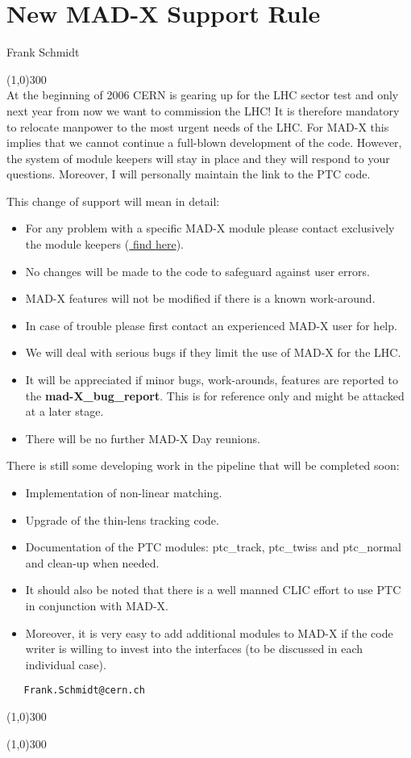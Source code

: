 
\section{New MAD-X Support Rule}

Frank Schmidt 

\line(1,0){300}
\\
 At the beginning of 2006 CERN is gearing up for the LHC sector test and
 only next year from now we want to commission the LHC! It is therefore
 mandatory to relocate manpower to the most urgent needs of the LHC. For
 MAD-X this implies that we cannot continue a full-blown development of
 the code. However, the system of module keepers will stay in place and
 they will respond to your questions. Moreover, I will personally
 maintain the link to the PTC code.  

 This change of support will mean in detail:  
\begin{itemize}
   \item For any problem with a specific MAD-X module please contact
     exclusively the module keepers (\href{module/node1.html}{ find
       here}). 
   \item No changes will be made to the code to safeguard against user errors.
   \item MAD-X features will not be modified if there is a known work-around.
   \item In case of trouble please first contact an experienced MAD-X user for help.
   \item We will deal with serious bugs if they limit the use of MAD-X for the LHC.
   \item It will be appreciated if minor bugs, work-arounds, features
     are reported to the \textbf{mad-X\_bug\_report}. This is for
     reference only and might be attacked at a later stage.  
   \item  There will be no further MAD-X Day reunions.
\end{itemize}

There is still some developing work in the pipeline that will be completed soon: 
\begin{itemize}
   \item Implementation of non-linear matching.
   \item Upgrade of the thin-lens tracking code.
   \item Documentation of the PTC modules: ptc\_track, ptc\_twiss and ptc\_normal and clean-up when needed.
   \item It should also be noted that there is a well manned CLIC effort to use PTC in conjunction with MAD-X.
   \item Moreover, it is very easy to add additional modules to MAD-X if
     the code writer is willing to invest into the interfaces (to be
     discussed in each individual case). 
\end{itemize}

\begin{verbatim}
   Frank.Schmidt@cern.ch
\end{verbatim}

\line(1,0){300}

\line(1,0){300}


